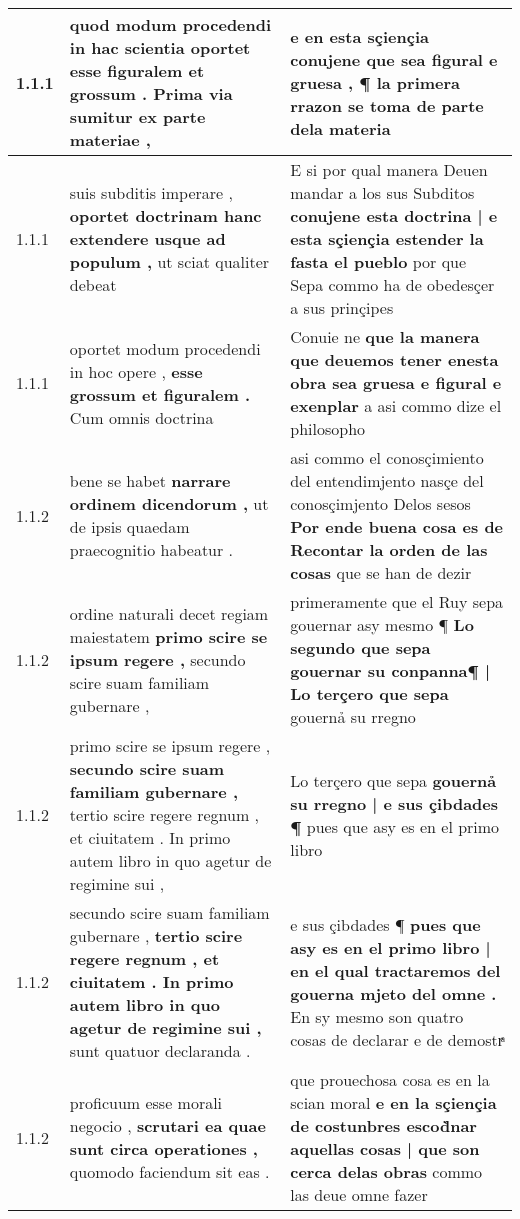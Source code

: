 \begin{tabular}{|p{1cm}|p{6.5cm}|p{6.5cm}|}

\hline
1.1.1 & quod modum procedendi in hac scientia oportet \textbf{ esse figuralem et grossum . } Prima via sumitur ex parte materiae , & e en esta sçiençia conujene \textbf{ que sea figural e gruesa , } ¶ la primera rrazon se toma de parte dela materia \\\hline
1.1.1 & suis subditis imperare , \textbf{ oportet doctrinam hanc extendere usque ad populum , } ut sciat qualiter debeat & E si por qual manera Deuen mandar a los sus Subditos \textbf{ conujene esta doctrina | e esta sçiençia estender la fasta el pueblo } por que Sepa commo ha de obedesçer a sus prinçipes \\\hline
1.1.1 & oportet modum procedendi in hoc opere , \textbf{ esse grossum et figuralem . } Cum omnis doctrina & Conuie ne \textbf{ que la manera que deuemos tener enesta obra sea gruesa e figural e exenplar } a asi commo dize el philosopho \\\hline
1.1.2 & bene se habet \textbf{ narrare ordinem dicendorum , } ut de ipsis quaedam praecognitio habeatur . & asi commo el conosçimiento del entendimjento nasçe del conosçimjento Delos sesos \textbf{ Por ende buena cosa es de Recontar la orden de las cosas } que se han de dezir \\\hline
1.1.2 & ordine naturali decet regiam maiestatem \textbf{ primo scire se ipsum regere , } secundo scire suam familiam gubernare , & primeramente que el Ruy sepa gouernar asy mesmo ¶ \textbf{ Lo segundo que sepa gouernar su conpanna¶ | Lo terçero que sepa } gouernả su rregno \\\hline
1.1.2 & primo scire se ipsum regere , \textbf{ secundo scire suam familiam gubernare , } tertio scire regere regnum , et ciuitatem . In primo autem libro in quo agetur de regimine sui , & Lo terçero que sepa \textbf{ gouernả su rregno | e sus çibdades ¶ } pues que asy es en el primo libro \\\hline
1.1.2 & secundo scire suam familiam gubernare , \textbf{ tertio scire regere regnum , et ciuitatem . In primo autem libro in quo agetur de regimine sui , } sunt quatuor declaranda . & e sus çibdades ¶ \textbf{ pues que asy es en el primo libro | en el qual tractaremos del gouerna mjeto del omne . } En sy mesmo son quatro cosas de declarar e de demostrͣ \\\hline
1.1.2 & proficuum esse morali negocio , \textbf{ scrutari ea quae sunt circa operationes , } quomodo faciendum sit eas . & que prouechosa cosa es en la scian moral \textbf{ e en la sçiençia de costunbres escod̀nar aquellas cosas | que son cerca delas obras } commo las deue omne fazer \\\hline

\end{tabular}
